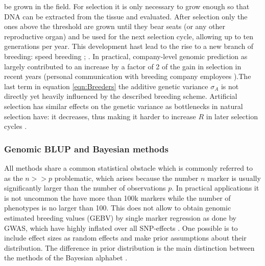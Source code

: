 be grown in the field. For selection it is only necessary to grow enough so that DNA can be extracted from the
tissue and evaluated. After selection only the ones above the threshold are grown until they bear seats (or
any other reproductive organ) and be used for the next selection cycle, allowing up to ten generations per
year. This development hast lead to the rise to a new branch of breeding: speed breeding
\cite{ghosh2018speed}; \cite{watson2018speed}.  In practical, company-level genomic prediction as largely
contributed to an increase by a factor of 2 of the gain in selection in recent years  (personal
communication with breeding company employees ).\newline The last term in equation \ref{eqn:Breeders} the additive genetic variance $\sigma_A$
is not directly yet heavily influenced by the described breeding scheme. Artificial selection has similar
effects on the genetic variance as bottlenecks in natural selection have: it decreases, thus making it harder
to increase $R$ in later selection cycles \cite{walsh2018}.


\subsubsection{Genomic BLUP and Bayesian methods}\label{blup:bayes}

All methods share a common statistical obstacle which is commonly referred to as the $n >> p$ problematic,
which arises because the number $n$ marker is usually significantly larger than the number of observations
$p$. In practical applications it is not uncommon the have more than 100k markers while the number of
phenotypes is no larger than 100. This does not allow to obtain genomic estimated breeding values (GEBV) by
single marker regression as done by GWAS, which have highly inflated over all SNP-effects
\cite{korte2013advantages}. One possible is to include effect sizes as random effects and make prior
assumptions about their distribution. The difference in prior distribution is the main distinction between the
methods of the Bayesian alphabet
\cite{gianola2013}.\\

